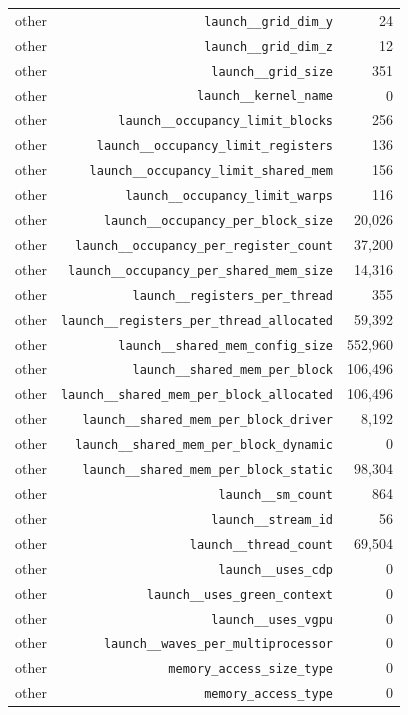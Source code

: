 \begin{table}[h]
\begin{tabular}{|l|r|r|}
other & \texttt{launch__grid_dim_y} & 24 \\
other & \texttt{launch__grid_dim_z} & 12 \\
other & \texttt{launch__grid_size} & 351 \\
other & \texttt{launch__kernel_name} & 0 \\
other & \texttt{launch__occupancy_limit_blocks} & 256 \\
other & \texttt{launch__occupancy_limit_registers} & 136 \\
other & \texttt{launch__occupancy_limit_shared_mem} & 156 \\
other & \texttt{launch__occupancy_limit_warps} & 116 \\
other & \texttt{launch__occupancy_per_block_size} & 20,026 \\
other & \texttt{launch__occupancy_per_register_count} & 37,200 \\
other & \texttt{launch__occupancy_per_shared_mem_size} & 14,316 \\
other & \texttt{launch__registers_per_thread} & 355 \\
other & \texttt{launch__registers_per_thread_allocated} & 59,392 \\
other & \texttt{launch__shared_mem_config_size} & 552,960 \\
other & \texttt{launch__shared_mem_per_block} & 106,496 \\
other & \texttt{launch__shared_mem_per_block_allocated} & 106,496 \\
other & \texttt{launch__shared_mem_per_block_driver} & 8,192 \\
other & \texttt{launch__shared_mem_per_block_dynamic} & 0 \\
other & \texttt{launch__shared_mem_per_block_static} & 98,304 \\
other & \texttt{launch__sm_count} & 864 \\
other & \texttt{launch__stream_id} & 56 \\
other & \texttt{launch__thread_count} & 69,504 \\
other & \texttt{launch__uses_cdp} & 0 \\
other & \texttt{launch__uses_green_context} & 0 \\
other & \texttt{launch__uses_vgpu} & 0 \\
other & \texttt{launch__waves_per_multiprocessor} & 0 \\
other & \texttt{memory_access_size_type} & 0 \\
other & \texttt{memory_access_type} & 0 \\

\end{tabular}
\end{table}
